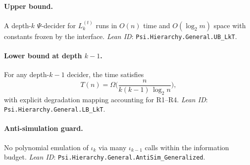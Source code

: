 \paragraph{Upper bound.} A depth-\(k\) \(\Psi\)-decider for \(L_k^{(t)}\) runs in \(O(n)\) time and \(O(\log_{2} m)\) space with constants frozen by the interface. \emph{Lean ID}: \texttt{Psi.Hierarchy.General.UB\_LkT}.

\paragraph{Lower bound at depth \(k-1\).} For any depth-\(k-1\) decider, the time satisfies
\[ T(n) = \Omega\!\Big(\frac{n}{k(k-1)\,\log_{2} n}\Big), \]
with explicit degradation mapping accounting for R1--R4. \emph{Lean ID}: \texttt{Psi.Hierarchy.General.LB\_LkT}.

\paragraph{Anti-simulation guard.} No polynomial emulation of \(\iota_k\) via many \(\iota_{k-1}\) calls within the information budget. \emph{Lean ID}: \texttt{Psi.Hierarchy.General.AntiSim\_Generalized}.




